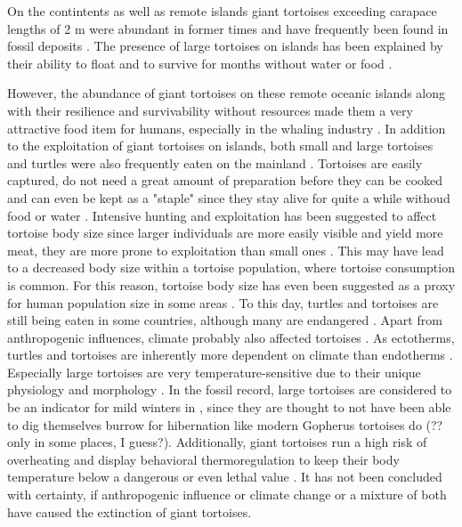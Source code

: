 On the contintents as well as remote islands giant tortoises exceeding carapace lengths of 2 m were abundant in former times and have frequently been found in fossil deposits \citep{.}. The presence of large tortoises on islands has been explained by their ability to float and to survive for months without water or food \citep{Gerlach2006, Patterson1973, Cheke2016}. 


However, the abundance of giant tortoises on these remote oceanic islands along with their resilience and survivability without resources made them a very attractive food item for humans, especially in the whaling industry \citep{.}.
In addition to the exploitation of giant tortoises on islands, both small and large tortoises and turtles were also frequently eaten on the mainland \citep{.}.
Tortoises are easily captured, do not need a great amount of preparation before they can be cooked and can even be kept as a "staple" since they stay alive for quite a while withoud food or water \citep{Thompson2002,Thompson2014}. Intensive hunting and exploitation has been suggested to affect tortoise body size \citep{.} since larger individuals are more easily visible and yield more meat, they are more prone to exploitation than small ones \citep{Rhodin2015}. This may have lead to a decreased body size within a tortoise population, where tortoise consumption is common.
For this reason, tortoise body size has even been suggested as a proxy for human population size in some areas \citep{Steele2005,Stiner1999,Stiner2000}.
To this day, turtles and tortoises are still being eaten in some countries, although many are endangered \citep{.}.
Apart from anthropogenic influences, climate probably also affected tortoises \citep{.}. 
As ectotherms, turtles and tortoises are inherently more dependent on climate than endotherms \citep{.}. Especially large tortoises are very temperature-sensitive due to their unique physiology and morphology \citep{Swingland1979a, Swingland1979b}. In the fossil record, large tortoises are considered to be an indicator for mild winters in \citep{Hibbard1960,Schleich1981}, since they are thought to not have been able to dig themselves burrow for hibernation like modern Gopherus tortoises do (?? only in some places, I guess?)\citep{Carlson1999, Stojanov2009}. Additionally, giant tortoises run a high risk of overheating and display behavioral thermoregulation to keep their body temperature below a dangerous or even lethal value \citep{Sturbaum1982, Schleich1981}.
It has not been concluded with certainty, if anthropogenic influence or climate change or a mixture of both have caused the extinction of giant tortoises\citep{.}.

